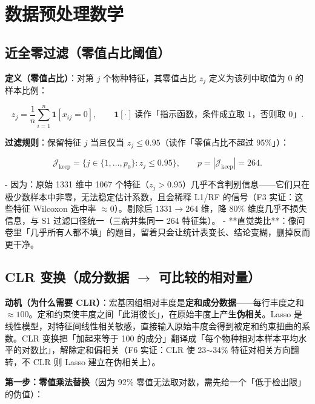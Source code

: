 \documentclass{internal-report}
\begin{document}
\section{数据预处理数学}
\label{sec:preprocess}

\subsection{近全零过滤（零值占比阈值）}
\label{sec:filter}

\textbf{定义（零值占比）}：对第 $j$ 个物种特征，其零值占比 $z_j$ 定义为该列中取值为 0 的样本比例：

\begin{equation}
  z_j = \frac{1}{n}\sum_{i=1}^{n}\mathbf{1}[x_{ij}=0],
  \qquad
  \mathbf{1}[\cdot]\ \text{读作「指示函数，条件成立取 1，否则取 0」}.
  \label{eq:zerofrac}
\end{equation}

\textbf{过滤规则}：保留特征 $j$ 当且仅当 $z_j \le 0.95$（读作「零值占比不超过 95\%」）：

\begin{equation}
  \mathcal{J}_{\text{keep}} = \big\{ j \in \{1,\dots,p_0\} : z_j \le 0.95 \big\},
  \qquad
  p = |\mathcal{J}_{\text{keep}}| = 264.
  \label{eq:filter}
\end{equation}

- 因为：原始 1331 维中 1067 个特征（$z_j>0.95$）几乎不含判别信息——它们只在极少数样本中非零，无法稳定估计系数，且会稀释 L1/RF 的信号（F3 实证：这些特征 Wilcoxon 选中率 $\approx 0$）。剔除后 $1331\to264$ 维，降 80\% 维度几乎不损失信息，与 S1 过滤口径统一（三病并集同一 264 特征集）。
- **直觉类比**：像问卷里「几乎所有人都不填」的题目，留着只会让统计表变长、结论变糊，删掉反而更干净。

\subsection{CLR 变换（成分数据 $\to$ 可比较的相对量）}
\label{sec:clr}

\textbf{动机（为什么需要 CLR）}：宏基因组相对丰度是\textbf{定和成分数据}——每行丰度之和 $\approx 100$。定和约束使丰度之间「此消彼长」，在原始丰度上产生\textbf{伪相关}。Lasso 是线性模型，对特征间线性相关敏感，直接输入原始丰度会得到被定和约束扭曲的系数。CLR 变换把「加起来等于 100 的成分」翻译成「每个物种相对本样本平均水平的对数比」，解除定和偏相关（F6 实证：CLR 使 23$\sim$34\% 特征对相关方向翻转，不 CLR 则 Lasso 建立在伪相关上）。

\textbf{第一步：零值乘法替换}（因为 92\% 零值无法取对数，需先给一个「低于检出限」的伪值）：
\end{document}
